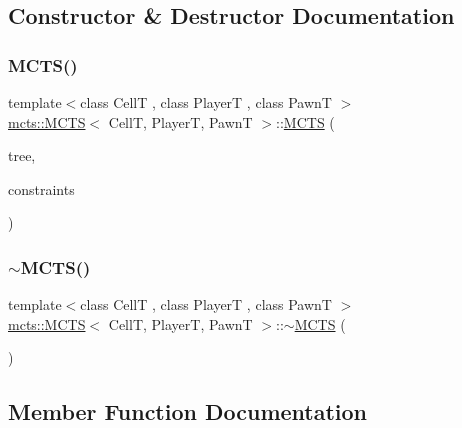 \subsection{Constructor \& Destructor Documentation}
\mbox{\label{classmcts_1_1_m_c_t_s_afa6deaf4737e68bee60a9bbd0d8178d2}} 
\subsubsection{\texorpdfstring{M\+C\+T\+S()}{MCTS()}}
{\footnotesize\ttfamily template$<$class CellT , class PlayerT , class PawnT $>$ \\
\hyperlink{classmcts_1_1_m_c_t_s}{mcts\+::\+M\+C\+TS}$<$ CellT, PlayerT, PawnT $>$\+::\hyperlink{classmcts_1_1_m_c_t_s}{M\+C\+TS} (\begin{DoxyParamCaption}\item[{\hyperlink{classmcts_1_1_tree}{mcts\+::\+Tree}$<$ CellT, PlayerT, PawnT $>$ $\ast$\&}]{tree,  }\item[{const \hyperlink{structmcts_1_1_m_c_t_s_constraints}{M\+C\+T\+S\+Constraints} \&}]{constraints }\end{DoxyParamCaption})\hspace{0.3cm}{\ttfamily [explicit]}}

\mbox{\label{classmcts_1_1_m_c_t_s_a8b88bfdafadbfe716dd10cd464e56e61}} 
\subsubsection{\texorpdfstring{$\sim$\+M\+C\+T\+S()}{~MCTS()}}
{\footnotesize\ttfamily template$<$class CellT , class PlayerT , class PawnT $>$ \\
\hyperlink{classmcts_1_1_m_c_t_s}{mcts\+::\+M\+C\+TS}$<$ CellT, PlayerT, PawnT $>$\+::$\sim$\hyperlink{classmcts_1_1_m_c_t_s}{M\+C\+TS} (\begin{DoxyParamCaption}{ }\end{DoxyParamCaption})}



\subsection{Member Function Documentation}
\mbox{\label{classmcts_1_1_m_c_t_s_a53275dba0c93543b2fa8c24ad928e4a8}} 
